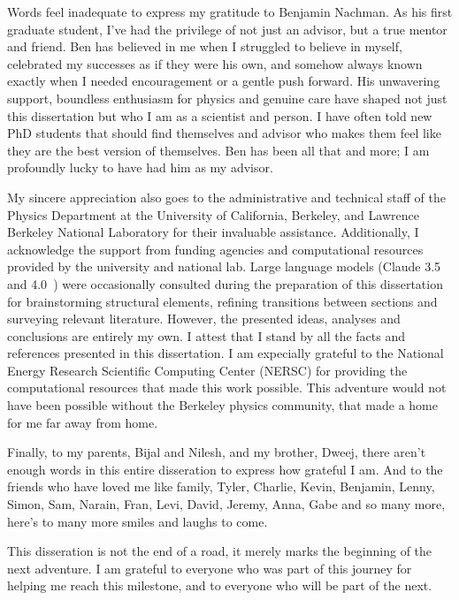 \begin{acknowledgements}
    Words feel inadequate to express my gratitude to Benjamin Nachman.
    As his first graduate student, I've had the privilege of not just an advisor, but a true mentor and friend.
    Ben has believed in me when I struggled to believe in myself, celebrated my successes as if they were his own, and somehow always known exactly when I needed encouragement or a gentle push forward.
    His unwavering support, boundless enthusiasm for physics and genuine care have shaped not just this dissertation but who I am as a scientist and person.
    I have often told new PhD students that should find themselves and advisor who makes them feel like they are the best version of themselves.
    Ben has been all that and more;
    I am profoundly lucky to have had him as my advisor.
    
    My sincere appreciation also goes to the administrative and technical staff of the Physics Department at the University of California, Berkeley, and Lawrence Berkeley National Laboratory for their invaluable assistance.
    Additionally, I acknowledge the support from funding agencies and computational resources provided by the university and national lab.
    Large language models (Claude 3.5~\cite{claude35sonnet2024} and 4.0~\cite{claude4opus2025}) were occasionally consulted during the preparation of this dissertation for brainstorming structural elements, refining transitions between sections and surveying relevant literature.
    However, the presented ideas, analyses and conclusions are entirely my own.
    I attest that I stand by all the facts and references presented in this dissertation.
    I am expecially grateful to the National Energy Research Scientific Computing Center (NERSC) for providing the computational resources that made this work possible.
    This adventure would not have been possible without the Berkeley physics community, that made a home for me far away from home.
    
    Finally, to my parents, Bijal and Nilesh, and my brother, Dweej, there aren't enough words in this entire disseration to express how grateful I am.
    And to the friends who have loved me like family, Tyler, Charlie, Kevin, Benjamin, Lenny, Simon, Sam, Narain, Fran, Levi, David, Jeremy, Anna, Gabe and so many more, here's to many more smiles and laughs to come.

    This disseration is not the end of a road, it merely marks the beginning of the next adventure.
    I am grateful to everyone who was part of this journey for helping me reach this milestone, and to everyone who will be part of the next.
    
\end{acknowledgements}